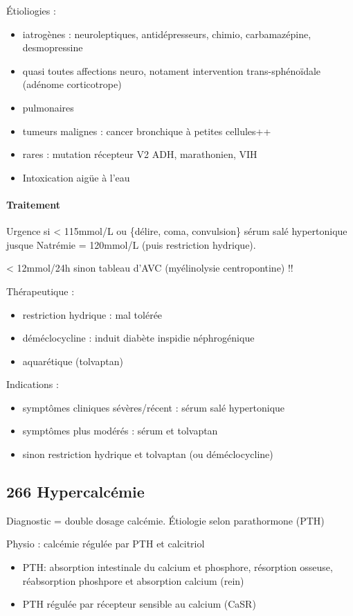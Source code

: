 \documentclass[11pt]{article}
\begin{document}
Étioliogies :
\begin{itemize}
\item iatrogènes : neuroleptiques, antidépresseurs, chimio, carbamazépine,
desmopressine
\item quasi toutes affections neuro, notament intervention trans-sphénoïdale
(adénome corticotrope)
\item pulmonaires
\item tumeurs malignes : cancer bronchique à petites cellules++
\item rares : mutation récepteur V2 ADH, marathonien, VIH
\item Intoxication aigüe à l'eau
\end{itemize}

\paragraph{Traitement}
\label{sec:orgceb6976}
Urgence si < 115mmol/L ou \{délire, coma, convulsion\} \faBomb \thus sérum salé
hypertonique jusque Natrémie = 120mmol/L (puis restriction hydrique).

\danger{} < 12mmol/24h sinon tableau d'AVC (myélinolysie centropontine) !! \faBomb

Thérapeutique :
\begin{itemize}
\item restriction hydrique : mal tolérée
\item déméclocycline : induit diabète inspidie néphrogénique
\item aquarétique (tolvaptan)
\end{itemize}

Indications :
\begin{itemize}
\item symptômes cliniques sévères/récent : sérum salé hypertonique
\item symptômes plus modérés : sérum et tolvaptan
\item sinon restriction hydrique et tolvaptan (ou déméclocycline)
\end{itemize}
\subsection{266 \textdagger{} Hypercalcémie}
\label{sec:orgf47b7f1}
Diagnostic = double dosage calcémie. Étiologie selon parathormone (PTH)

Physio : calcémie régulée par PTH et calcitriol
\begin{itemize}
\item PTH: \inc absorption intestinale du calcium et phosphore, \inc résorption
osseuse, \dec réabsorption phoshpore et \inc absorption calcium (rein)
\item PTH régulée par récepteur sensible au calcium (CaSR)
\end{itemize}
\end{document}
